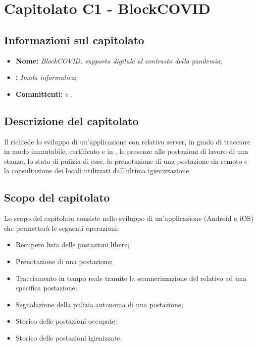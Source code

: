\section{Capitolato C1 - BlockCOVID}\label{C1}
\subsection{Informazioni sul capitolato}
\begin{itemize}
	\item \textbf{Nome:} \textit{BlockCOVID: supporto digitale al contrasto della pandemia};
	\item \textbf{:} \textit{Imola informatica};
	\item \textbf{Committenti:} \textit{\VT{} e \CR{}}.
\end{itemize}

\subsection{Descrizione del capitolato}
Il  richiede lo sviluppo di un'applicazione con relativo server, in grado di tracciare in modo immutabile, certificato e in , le presenze alle postazioni di lavoro di una stanza, lo stato di pulizia di esse, la prenotazione di una postazione da remoto e la consultazione dei locali utilizzati dall'ultima igienizzazione.

\subsection{Scopo del capitolato}
Lo scopo del capitolato consiste nello sviluppo di un'applicazione (Android o iOS) che permetterà le seguenti operazioni:
\begin{itemize}
	\item Recupero lista delle postazioni libere;
	\item Prenotazione di una postazione;
	\item Tracciamento in tempo reale tramite la scannerizzazione del  relativo ad una specifica postazione;
	\item Segnalazione della pulizia autonoma di una postazione;
	\item Storico delle postazioni occupate;
	\item Storico delle postazioni igienizzate.
\end{itemize}

